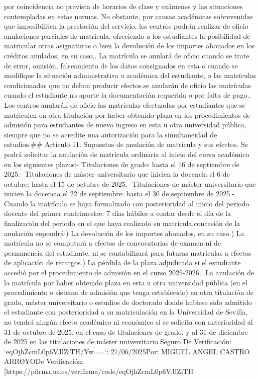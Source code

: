 \documentclass{article}
\begin{document}
\begin{itemize}
por coincidencia no prevista de horarios de clase y exámenes y las situaciones contempladas en estas normas. No obstante, por causas académicas sobrevenidas que imposibiliten la prestación del servicio, los centros podrán realizar de oficio anulaciones parciales de matrícula, ofreciendo a los estudiantes la posibilidad de matricular otras asignaturas o bien la devolución de los importes abonados en los créditos anulados, en su caso.\n{}. La matrícula se anulará de oficio cuando se trate de error, omisión, falseamiento de los datos consignados en esta o cuando se modifique la situación administrativa o académica del estudiante, o las matrículas condicionadas que no deban producir efectos.\n\nAsimismo se anularán de oficio las matrículas cuando el estudiante no aporte la documentación requerida o por falta de pago.\n{}. Los centros anularán de oficio las matrículas efectuadas por estudiantes que se matriculen en otra titulación por haber obtenido plaza en los procedimientos de admisión para estudiantes de nuevo ingreso en esta u otra universidad pública, siempre que no se acredite una autorización para la simultaneidad de estudios.\n\n## Artículo 11. Supuestos de anulación de matrícula y sus efectos\n{}. Se podrá solicitar la anulación de matrícula ordinaria al inicio del curso académico en los siguientes plazos:\n\n- Titulaciones de grado: hasta el 16 de septiembre de 2025.\n- Titulaciones de máster universitario que inicien la docencia el 6 de octubre: hasta el 15 de octubre de 2025.\n- Titulaciones de máster universitario que inicien la docencia el 22 de septiembre: hasta el 30 de septiembre de 2025.\n- Cuando la matrícula se haya formalizado con posterioridad al inicio del periodo docente del primer cuatrimestre: 7 días hábiles a contar desde el día de la finalización del periodo en el que haya realizado su matrícula.\n\nLa concesión de la anulación supondrá:\n\na) La devolución de los importes abonados, en su caso.\n\nb) La matrícula no se computará a efectos de convocatorias de examen ni de permanencia del estudiante, ni se contabilizará para futuras matrículas a efectos de aplicación de recargos.\n\nc) La pérdida de la plaza adjudicada si el estudiante accedió por el procedimiento de admisión en el curso 2025-2026.\n{}. La anulación de la matrícula por haber obtenido plaza en esta u otra universidad pública (en el procedimiento o sistema de admisión que tenga establecido) en otra titulación de grado, máster universitario o estudios de doctorado donde hubiese sido admitido el estudiante con posterioridad a su matriculación en la Universidad de Sevilla, no tendrá ningún efecto académico ni económico si se solicita con anterioridad al 31 de octubre de 2025, en el caso de titulaciones de grado, y al 31 de diciembre de 2025 en las titulaciones de máster universitario.\n{} Seguro De Verificación: `eqOjhZcmL0p6VJlZiTH/Yw==`\nFecha: 27/06/2025\nFirmado Por: MIGUEL ANGEL CASTRO ARROYO\nUrl De Verificación: [https://pfirma.us.es/verifirma/code/eqOjhZcmL0p6VJlZiTH%
\end{itemize}
\end{document}
